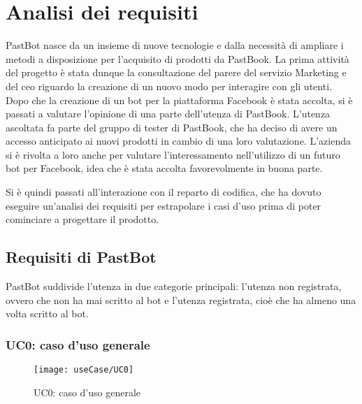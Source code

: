 
\chapter{Analisi dei requisiti}

PastBot nasce da un insieme di nuove tecnologie e dalla necessità di ampliare i
metodi a disposizione per l'acquisito di prodotti da PastBook.
La prima attività del progetto è stata dunque la consultazione del parere del
servizio Marketing e del \gls{ceo} riguardo la creazione di un nuovo modo per
interagire con gli utenti. Dopo che la creazione di un bot per la piattaforma
Facebook è stata accolta, si è passati a valutare l'opinione di una parte
dell'utenza di PastBook. L'utenza ascoltata fa parte del gruppo di tester di
PastBook, che ha deciso di avere un accesso anticipato ai nuovi prodotti in
cambio di una loro valutazione. L'azienda si è rivolta a loro anche per valutare
l'interessamento nell'utilizzo di un futuro bot per Facebook, idea che è stata
accolta favorevolmente in buona parte.

Si è quindi passati all'interazione con il reparto di codifica, che ha dovuto
eseguire un'analisi dei requisiti per estrapolare i casi d'uso prima di poter
cominciare a progettare il prodotto.

\section{Requisiti di PastBot}

PastBot suddivide l'utenza in due categorie principali:
l'utenza non registrata, ovvero che non ha mai scritto al bot e
l'utenza registrata, cioè che ha almeno una volta scritto al bot.

\subsection{UC0: caso d'uso generale}
\label{uc:uc0}

\begin{figure}[H]
  \centering
  \texttt{[image: useCase/UC0]}
  \caption{UC0: caso d'uso generale}
\end{figure}

